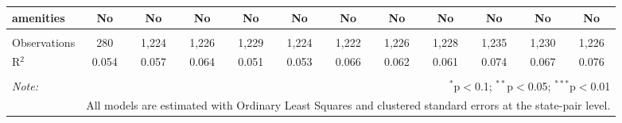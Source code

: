 \begin{table}[!htbp]
\begin{tabular}{@{\extracolsep{5pt}}lccccccccccc}
amenities & No & No & No & No & No & No & No & No & No & No & No \\ 
\hline \\[-1.8ex] 
Observations & 280 & 1,224 & 1,226 & 1,229 & 1,224 & 1,222 & 1,226 & 1,228 & 1,235 & 1,230 & 1,226 \\ 
R$^{2}$ & 0.054 & 0.057 & 0.064 & 0.051 & 0.053 & 0.066 & 0.062 & 0.061 & 0.074 & 0.067 & 0.076 \\ 
\hline 
\hline \\[-1.8ex] 
\textit{Note:}  & \multicolumn{11}{r}{$^{*}$p$<$0.1; $^{**}$p$<$0.05; $^{***}$p$<$0.01} \\ 
 & \multicolumn{11}{r}{All models are estimated with Ordinary Least Squares and clustered standard errors at the state-pair level.} \\ 
\end{tabular} 
\end{table} 
